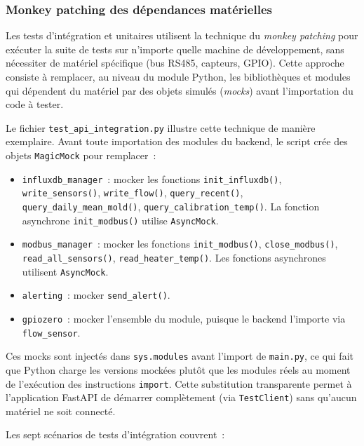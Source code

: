 \subsubsection{Monkey patching des dépendances matérielles}

Les tests d'intégration et unitaires utilisent la technique du \textit{monkey patching} pour exécuter la suite de tests sur n'importe quelle machine de développement, sans nécessiter de matériel spécifique (bus RS485, capteurs, GPIO). Cette approche consiste à remplacer, au niveau du module Python, les bibliothèques et modules qui dépendent du matériel par des objets simulés (\textit{mocks}) avant l'importation du code à tester.

Le fichier \texttt{test\_api\_integration.py} illustre cette technique de manière exemplaire. Avant toute importation des modules du backend, le script crée des objets \texttt{MagicMock} pour remplacer~:

\begin{itemize}
  \item \texttt{influxdb\_manager}~: mocker les fonctions \texttt{init\_influxdb()}, \texttt{write\_sensors()}, \texttt{write\_flow()}, \texttt{query\_recent()}, \texttt{query\_daily\_mean\_mold()}, \texttt{query\_calibration\_temp()}. La fonction asynchrone \texttt{init\_modbus()} utilise \texttt{AsyncMock}.
  \item \texttt{modbus\_manager}~: mocker les fonctions \texttt{init\_modbus()}, \texttt{close\_modbus()}, \texttt{read\_all\_sensors()}, \texttt{read\_heater\_temp()}. Les fonctions asynchrones utilisent \texttt{AsyncMock}.
  \item \texttt{alerting}~: mocker \texttt{send\_alert()}.
  \item \texttt{gpiozero}~: mocker l'ensemble du module, puisque le backend l'importe via \texttt{flow\_sensor}.
\end{itemize}

Ces mocks sont injectés dans \texttt{sys.modules} avant l'import de \texttt{main.py}, ce qui fait que Python charge les versions mockées plutôt que les modules réels au moment de l'exécution des instructions \texttt{import}. Cette substitution transparente permet à l'application FastAPI de démarrer complètement (via \texttt{TestClient}) sans qu'aucun matériel ne soit connecté.

Les sept scénarios de tests d'intégration couvrent~:

